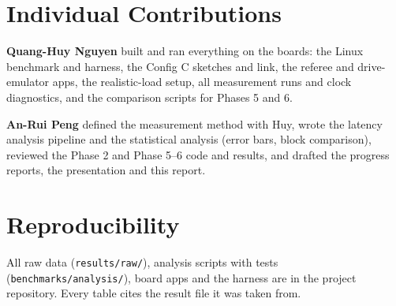 \section*{Individual Contributions}
\textbf{Quang-Huy Nguyen} built and ran everything on the boards: the Linux benchmark and harness, the Config C sketches and link, the referee and drive-emulator apps, the realistic-load setup, all measurement runs and clock diagnostics, and the comparison scripts for Phases 5 and 6.

\textbf{An-Rui Peng} defined the measurement method with Huy, wrote the latency analysis pipeline and the statistical analysis (error bars, block comparison), reviewed the Phase 2 and Phase 5--6 code and results, and drafted the progress reports, the presentation and this report.

\section*{Reproducibility}
All raw data (\texttt{results/raw/}), analysis scripts with tests (\texttt{benchmarks/analysis/}), board apps and the harness are in the project repository. Every table cites the result file it was taken from.
